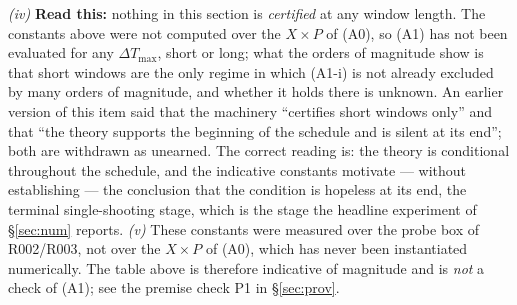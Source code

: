 \documentclass[11pt]{article}
\theoremstyle{remark}\newtheorem{remark}{Remark}
\begin{document}
{\emph{(iv)} \textbf{Read this:} nothing in this section is \emph{certified} at any window length. The constants above were not computed over the $X\times P$ of (A0), so (A1) has not been evaluated for any $\Delta T_{\max}$, short or long; what the orders of magnitude show is that short windows are the only regime in which (A1-i) is not already excluded by many orders of magnitude, and whether it holds there is unknown. An earlier version of this item said that the machinery ``certifies short windows only'' and that ``the theory supports the beginning of the schedule and is silent at its end''; both are withdrawn as unearned. The correct reading is: the theory is conditional throughout the schedule, and the indicative constants motivate --- without establishing --- the conclusion that the condition is hopeless at its end, the terminal single-shooting stage, which is the stage the headline experiment of \S\ref{sec:num} reports.
\emph{(v)} These constants were measured over the probe box of R002/R003, not over the $X\times P$ of (A0), which has never been instantiated numerically. The table above is therefore indicative of magnitude and is \emph{not} a check of (A1); see the premise check P1 in \S\ref{sec:prov}.}
\end{document}
